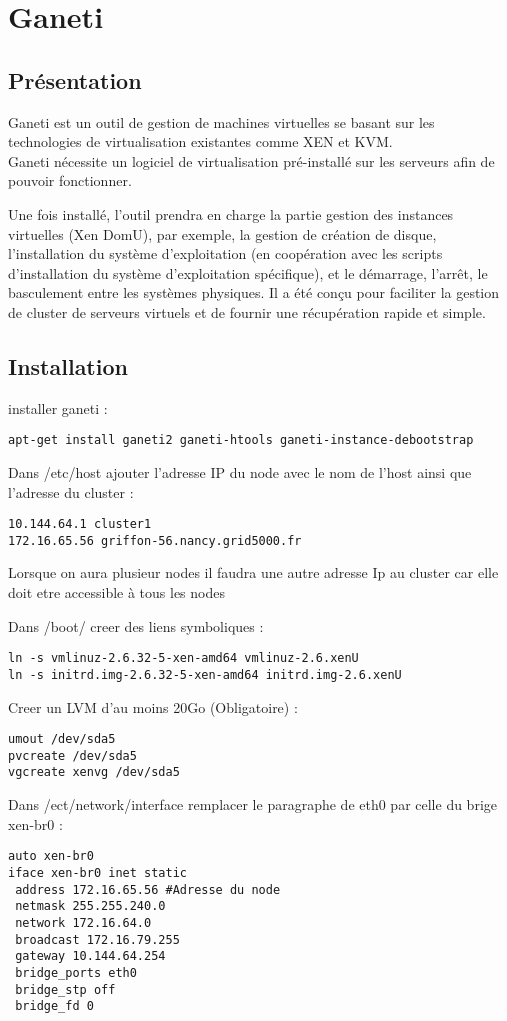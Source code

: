 \lstset{language=bash}
\chapter{Ganeti}
\section{Présentation}
Ganeti est un outil de gestion de machines virtuelles se basant sur les technologies de virtualisation existantes comme XEN et KVM.\\
Ganeti nécessite un logiciel de virtualisation pré-installé sur les serveurs afin de pouvoir fonctionner. 

Une fois installé, l'outil prendra en charge la partie gestion des instances virtuelles (Xen DomU), par exemple, la gestion de création de disque, l'installation du système d'exploitation (en coopération avec les scripts d'installation du système d'exploitation spécifique), et le démarrage, l'arrêt, le basculement entre les systèmes physiques. Il a été conçu pour faciliter la gestion de cluster de serveurs virtuels et de fournir une récupération rapide et simple.
\section{Installation}
installer ganeti :
\begin{lstlisting}
apt-get install ganeti2 ganeti-htools ganeti-instance-debootstrap
\end{lstlisting}
Dans /etc/host ajouter l'adresse IP du node avec le nom de l'host ainsi que l'adresse du cluster :
\begin{lstlisting}
10.144.64.1 cluster1
172.16.65.56 griffon-56.nancy.grid5000.fr
\end{lstlisting}
Lorsque on aura plusieur nodes il faudra une autre adresse Ip au cluster car elle doit etre accessible à tous les nodes

Dans /boot/ creer des liens symboliques :
\begin{lstlisting}
ln -s vmlinuz-2.6.32-5-xen-amd64 vmlinuz-2.6.xenU
ln -s initrd.img-2.6.32-5-xen-amd64 initrd.img-2.6.xenU
\end{lstlisting}

Creer un LVM d'au moins 20Go (Obligatoire) :
\begin{lstlisting}
umout /dev/sda5
pvcreate /dev/sda5
vgcreate xenvg /dev/sda5
\end{lstlisting}
Dans /ect/network/interface remplacer le paragraphe de eth0 par celle du brige xen-br0 :
\begin{lstlisting}
auto xen-br0
iface xen-br0 inet static
 address 172.16.65.56 #Adresse du node
 netmask 255.255.240.0 
 network 172.16.64.0
 broadcast 172.16.79.255
 gateway 10.144.64.254
 bridge_ports eth0
 bridge_stp off
 bridge_fd 0
\end{lstlisting}
